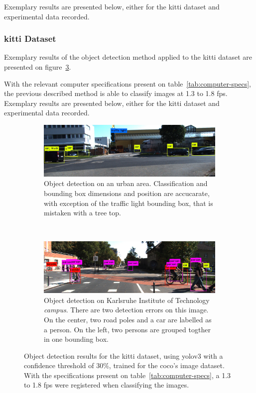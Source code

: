 Exemplary results are presented below, either for the \ac{kitti} dataset and experimental data recorded. 
	
\subsubsection{\ac{kitti} Dataset}
Exemplary results of the object detection method applied to the \ac{kitti} dataset are presented on figure~\ref{fig:kitti-object-detection}. 

With the relevant computer specifications present on table~\ref{tab:computer-specs}, the previous described method is able to classify images at 1.3 to 1.8 \ac{fps}. Exemplary results are presented below, either for the \ac{kitti} dataset and experimental data recorded. 

\begin{figure}[ht!]
	\centering
	\begin{subfigure}[c]{0.8\textwidth}
		\includegraphics[width=\textwidth]{img/object-detection/kitti-4.jpg}
		\caption{Object detection on an urban area. Classification and bounding box dimensions and position are accucarate, with exception of the traffic light bounding box, that is mistaken with a tree top.}
		\label{fig:kitti-yolo-3}
	\end{subfigure}
	\\ \vspace{4mm}
	\begin{subfigure}[c]{0.8\textwidth}
		\includegraphics[width=\textwidth]{img/object-detection/kitti-2.jpg}
		\caption{Object detection on Karlsruhe Institute of Technology \textit{campus}. There are two detection errors on this image. On the center, two road poles and a car are labelled as a person. On the left, two persons are grouped togther in one bounding box.}
		\label{fig:kitti-yolo-2}
	\end{subfigure}
	\caption{Object detection results for the \ac{kitti} dataset, using \ac{yolo}v3 with a confidence threshold of 30\%, trained for the \ac{coco}'s image dataset. With the specifications present on table~\ref{tab:computer-specs}, a 1.3 to 1.8 \ac{fps} were registered when classifying the images.}
	\label{fig:kitti-object-detection}
\end{figure}


